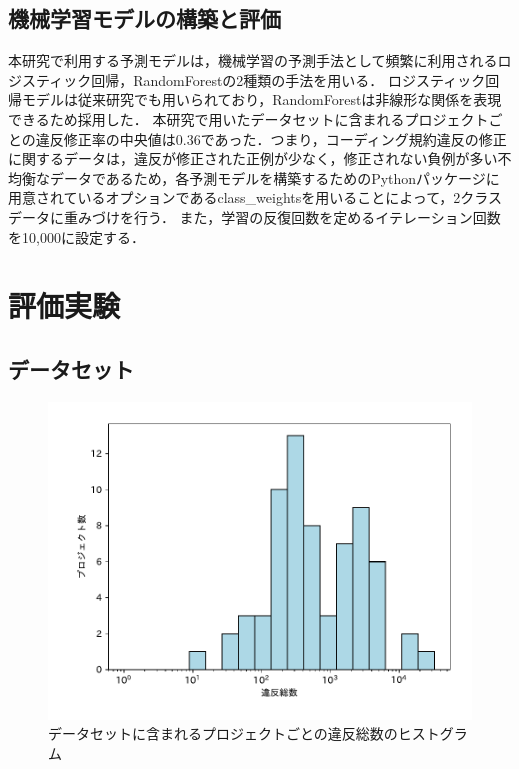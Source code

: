 \documentclass[submit,noauthor,ses,dvipdfmx]{ipsj}
\begin{document}
\subsection{機械学習モデルの構築と評価}

本研究で利用する予測モデルは，機械学習の予測手法として頻繁に利用されるロジスティック回帰，RandomForestの2種類の手法を用いる．
ロジスティック回帰モデルは従来研究でも用いられており\cite{JyuraiPre}，RandomForestは非線形な関係を表現できるため採用した．
本研究で用いたデータセットに含まれるプロジェクトごとの違反修正率の中央値は0.36であった．つまり，コーディング規約違反の修正に関するデータは，違反が修正された正例が少なく，修正されない負例が多い不均衡なデータであるため，各予測モデルを構築するためのPythonパッケージに用意されているオプションであるclass\_weightsを用いることによって，2クラスデータに重みづけを行う．
また，学習の反復回数を定めるイテレーション回数を10,000に設定する．

\section{評価実験}\label{chap:result}

\subsection{データセット}

\begin{figure}[t]
	\centering
	\includegraphics[width=1\linewidth]{Kameoka_fig/dataset_hist.pdf}
	\caption{データセットに含まれるプロジェクトごとの違反総数のヒストグラム}
	\label{fig:dataset}
\end{figure}
\end{document}
